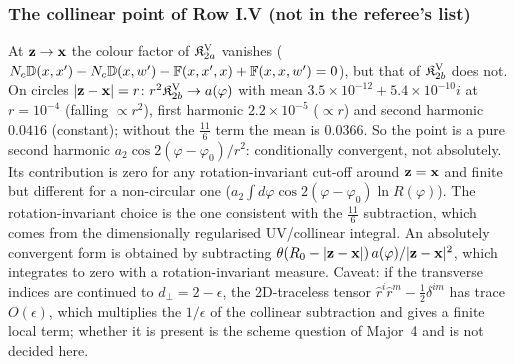 \subsubsection{The collinear point of Row I.V (not in the referee's list)}\label{sec:r3f-IV}
 At $\mathbf{z}\to\mathbf{x}$ the colour factor of $\mathfrak K^{\rm V}_{2a}$ vanishes ($N_c\mathbb{D}(x,x')-N_c\mathbb{D}(x,w')-\mathbb{F}(x,x',x)+\mathbb{F}(x,x,w')=0$), but that of $\mathfrak K^{\rm V}_{2b}$ does not. On circles $|\mathbf{z}-\mathbf{x}|=r$: $r^2\mathfrak K^{\rm V}_{2b}\to a(\varphi)$ with mean $3.5\times10^{-12}+5.4\times10^{-10}i$ at $r=10^{-4}$ (falling $\propto r^2$), first harmonic $2.2\times10^{-5}$ ($\propto r$) and second harmonic $0.0416$ (constant); without the $\frac{11}{6}$ term the mean is $0.0366$. So the point is a pure second harmonic $a_2\cos2(\varphi-\varphi_0)/r^2$: conditionally convergent, not absolutely. Its contribution is zero for any rotation-invariant cut-off around $\mathbf{z}=\mathbf{x}$ and finite but different for a non-circular one ($a_2\int d\varphi\cos2(\varphi-\varphi_0)\ln R(\varphi)$). The rotation-invariant choice is the one consistent with the $\frac{11}{6}$ subtraction, which comes from the dimensionally regularised UV/collinear integral. An absolutely convergent form is obtained by subtracting $\theta(R_0-|\mathbf{z}-\mathbf{x}|)\,a(\varphi)/|\mathbf{z}-\mathbf{x}|^2$, which integrates to zero with a rotation-invariant measure. Caveat: if the transverse indices are continued to $d_\perp=2-\epsilon$, the 2D-traceless tensor $\hat r^i\hat r^m-\frac12\delta^{im}$ has trace $O(\epsilon)$, which multiplies the $1/\epsilon$ of the collinear subtraction and gives a finite local term; whether it is present is the scheme question of Major~4 and is not decided here.

